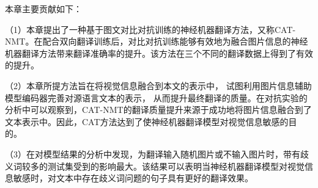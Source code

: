 本章主要贡献如下：

（1）本章提出了一种基于图文对比对抗训练的神经机器翻译方法，又称CAT-NMT。在配合双向翻译训练后，对比对抗训练能够有效地为融合图片信息的神经机器翻译方法带来翻译准确率的提升。该方法在三个不同的翻译数据上得到了有效的提升。

（2）本章所提方法旨在将视觉信息融合到本文的表示中，
试图利用图片信息辅助模型编码器完善对源语言文本的表示，
从而提升最终翻译的质量。在对抗实验的分析中可以观察到，CAT-NMT的翻译质量提升来源于成功地将图片信息融合到了文本表示中。因此，CAT方法达到了使神经机器翻译模型对视觉信息敏感的目的。

（3）在对模型结果的分析中发现，为翻译输入随机图片或不输入图片时，带有歧义词较多的测试集受到的影响最大。该结果可以表明当神经机器翻译模型对视觉信息敏感时，对文本中存在歧义词问题的句子具有更好的翻译效果。